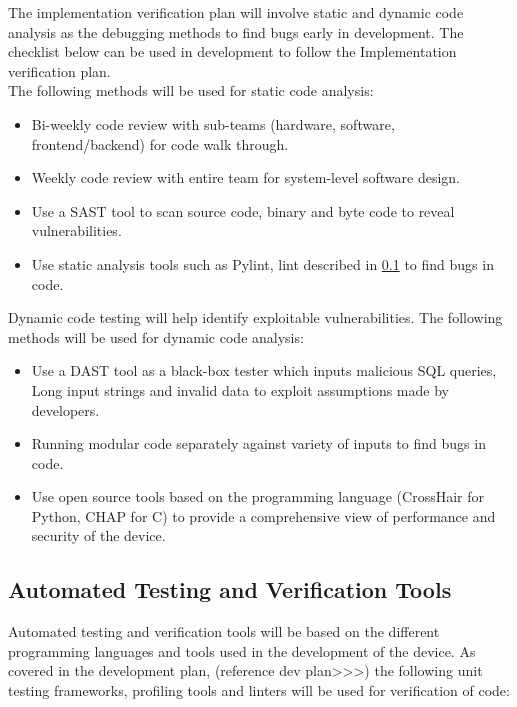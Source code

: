 \documentclass[12pt, titlepage]{article}
\begin{document}
The implementation verification plan will involve static and dynamic code analysis as the debugging methods to find bugs early in development. The checklist below can be used in development to follow the Implementation verification plan.\\
The following methods will be used for static code analysis:
\begin{itemize}
\item Bi-weekly code review with sub-teams (hardware, software, frontend/backend) for code walk through.
\item Weekly code review with entire team for system-level software design.
\item Use a SAST tool to scan source code, binary and byte code to reveal vulnerabilities.
\item Use static analysis tools such as Pylint, lint described in \ref{Automation} to find bugs in code.
\end{itemize}
Dynamic code testing will help identify exploitable vulnerabilities. The following methods will be used for dynamic code analysis:
\begin{itemize}
\item Use a DAST tool as a black-box tester which inputs malicious SQL queries, Long input strings and invalid data to exploit assumptions made by developers.
\item Running modular code separately against variety of inputs to find bugs in code.
\item Use open source tools based on the programming language (CrossHair for Python, CHAP for C) to provide a comprehensive view of performance and security of the device.
\end{itemize}


\subsection{Automated Testing and Verification Tools}\label{Automation}

Automated testing and verification tools will be based on the different programming languages and tools used in the development of the device. As covered in the development plan, (reference dev plan>>>) the following unit testing frameworks, profiling tools and linters will be used for verification of code:
\end{document}

